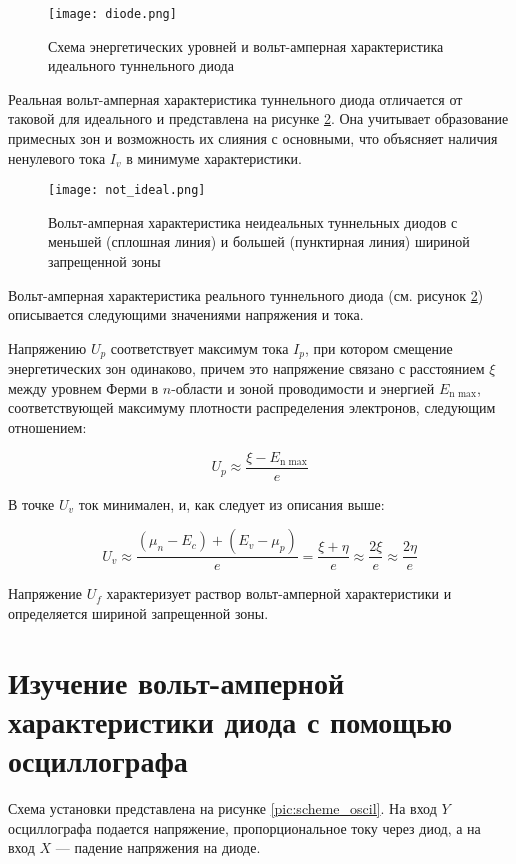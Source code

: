 \documentclass[a4paper]{article}
\begin{document}
	\begin{figure}[h]
		\centering	
		\texttt{[image: diode.png]}
		\caption{Схема энергетических уровней и вольт-амперная характеристика идеального туннельного диода}
		\label{pic:diode}
	\end{figure}  
	
	Реальная вольт-амперная характеристика туннельного диода отличается от таковой для идеального и представлена на рисунке \ref{pic:not_ideal}. Она учитывает образование примесных зон и возможность их слияния с основными, что объясняет наличия ненулевого тока $I_v$ в минимуме характеристики. 
	
	\begin{figure}[h]
		\centering	
		\texttt{[image: not\_ideal.png]}
		\caption{Вольт-амперная характеристика неидеальных туннельных диодов с меньшей (сплошная линия) и большей (пунктирная линия) шириной запрещенной зоны}
		\label{pic:not_ideal}
	\end{figure}  
	
	Вольт-амперная характеристика реального туннельного диода (см. рисунок \ref{pic:not_ideal}) описывается следующими значениями напряжения и тока. 
	
	Напряжению $U_p$ соответствует максимум тока $I_p$, при котором смещение энергетических зон одинаково, причем это напряжение связано с расстоянием $\xi$ между уровнем Ферми в $n$-области и зоной проводимости и энергией $E_\text{n max}$, соответствующей максимуму плотности распределения электронов, следующим отношением: 
	
	\[ U_p \approx \frac{\xi - E_\text{n max}}{e} \]
	
	В точке $U_v$ ток минимален, и, как следует из описания выше:
	
	\[ U_v \approx \frac{(\mu_n - E_c) + (E_v - \mu_p)}{e} = \frac{\xi + \eta}{e} \approx \frac{2\xi}{e} \approx \frac{2\eta}{e} \]
	
	Напряжение $U_f$ характеризует раствор вольт-амперной характеристики и определяется шириной запрещенной зоны. 


	\section{Изучение вольт-амперной характеристики диода с помощью осциллографа}
	
	Схема установки представлена на рисунке \ref{pic:scheme_oscil}. На вход $ Y $ осциллографа подается напряжение, пропорциональное току через диод, а на вход $ X $ --- падение напряжения на диоде.
	
\end{document}
